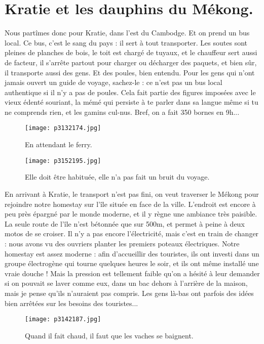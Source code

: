 \documentclass{book}
\begin{document}
\chapter{Kratie et les dauphins du Mékong.}
Nous partîmes donc pour Kratie, dans l'est du Cambodge. Et on prend un bus local. Ce bus, c'est le sang du pays : il sert à tout transporter. Les soutes sont pleines de planches de bois, le toit est chargé de tuyaux, et le chauffeur sert aussi de facteur, il s'arrête partout pour charger ou décharger des paquets, et bien sûr, il transporte aussi des gens. Et des poules, bien entendu. Pour les gens qui n'ont jamais ouvert un guide de voyage, sachez-le : ce n'est pas un bus local authentique si il n'y a pas de poules. Cela fait partie des figures imposées avec le vieux édenté souriant, la mémé qui persiste à te parler dans sa langue même si tu ne comprends rien, et les gamins cul-nus. Bref, on a fait 350 bornes en 9h...


\begin{figure}[h]
\centering
\texttt{[image: p3132174.jpg]}
\caption*{En attendant le ferry.}
\end{figure}




\begin{figure}[h]
\centering
\texttt{[image: p3152195.jpg]}
\caption*{Elle doit être habituée, elle n'a pas fait un bruit du voyage.}
\end{figure}

En arrivant à Kratie, le transport n'est pas fini, on veut traverser le Mékong pour rejoindre notre homestay sur l'île située en face de la ville. L'endroit est encore à peu près épargné par le monde moderne, et il y règne une ambiance très paisible. La seule route de l'île n'est bétonnée que sur 500m, et permet à peine à deux motos de se croiser. Il n'y a pas encore l'électricité, mais c'est en train de changer : nous avons vu des ouvriers planter les premiers poteaux électriques. Notre homestay est assez moderne : afin d'accueillir des touristes, ils ont investi dans un groupe électrogène qui tourne quelques heures le soir, et ils ont même installé une vraie douche ! Mais la pression est tellement faible qu'on a hésité à leur demander si on pouvait se laver comme eux, dans un bac dehors à l'arrière de la maison, mais je pense qu'ils n'auraient pas compris. Les gens là-bas ont parfois des idées bien arrêtées sur les besoins des touristes...


\begin{figure}[h]
\centering
\texttt{[image: p3142187.jpg]}
\caption*{Quand il fait chaud, il faut que les vaches se baignent.}
\end{figure}
\end{document}
